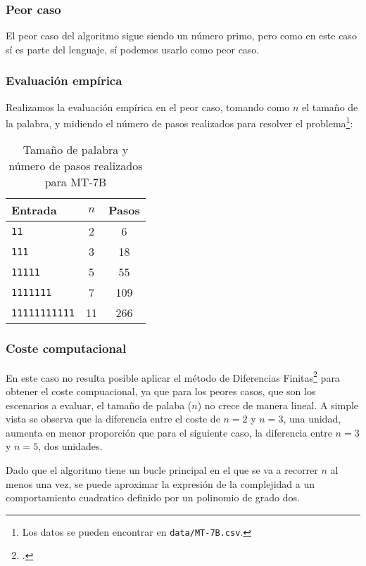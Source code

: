 

\subsubsection*{Peor caso}
El peor caso del algoritmo sigue siendo un número primo, pero como en este caso sí es parte del lenguaje, sí podemos usarlo como peor caso.


\subsubsection*{Evaluación empírica}
Realizamos la evaluación empírica en el peor caso, tomando como $n$ el tamaño de la palabra, y midiendo el número de pasos realizados para resolver el problema\footnote{Los datos se pueden encontrar en \texttt{data/MT-7B.csv}.}:

\begin{table}[h]
    \centering
    \begin{tabular}{lcc}
        Entrada & $n$ & Pasos \\
        \hline
        \texttt{11}            &  2  & 6   \\
        \texttt{111}           &  3  & 18  \\
        \texttt{11111}         &  5  & 55  \\
        \texttt{1111111}       &  7  & 109 \\
        \texttt{11111111111}   & 11  & 266 \\
    \end{tabular}
    \caption{Tamaño de palabra y número de pasos realizados para MT-7B}
\end{table}


\subsubsection*{Coste computacional}
En este caso no resulta posible aplicar el método de Diferencias Finitas\footcite[ver][pgs. 1-42: \textit{Chapter 1. Difference Tables and Polynomial Fits}]{cuoco2005mathematical} para obtener el coste compuacional, ya que para los peores casos, que son los escenarios a evaluar, el tamaño de palaba ($n$) no crece de manera lineal. A simple vista se observa que la diferencia entre el coste de $n=2$ y $n=3$, una unidad, aumenta en menor proporción que para el siguiente caso, la diferencia entre $n=3$ y $n=5$, dos unidades.\medskip

Dado que el algoritmo tiene un bucle principal en el que se va a recorrer $n$ al menos una vez, se puede aproximar la expresión de la complejidad a un comportamiento cuadratico definido por un polinomio de grado dos.

